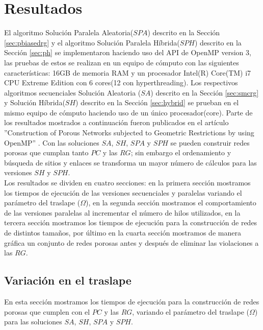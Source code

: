 \chapter{Resultados}
\label{champ:results}
\bigskip
\barra
\bigskip
El algoritmo Solución Paralela Aleatoria($SPA$) descrito en la Sección \ref{sec:pbiasedrg} y el algoritmo Solución Paralela Híbrida($SPH$) descrito en la Sección \ref{sec:ph} se implementaron haciendo uso del API de OpenMP version 3, las pruebas de estos se realizan en un equipo de cómputo con las siguientes características: 16GB de memoria  RAM y un procesador Intel(R) Core(TM) i7 CPU  Extreme Edition con 6 cores(12 con hyperthreading). Los respectivos  algoritmos secuenciales Solución Aleatoria ($SA$) descrito en la Sección \ref{sec:smcrg} y Solución Híbrida($SH$) descrito en la Sección \ref{sec:hybrid} se prueban en el mismo equipo de cómputo haciendo uso de un único procesador(core). Parte de los resultados mostrados a continuación fueron publicados en el artículo ''Construction of Porous Networks subjected to Geometric Restrictions by using OpenMP'' \cite{ref16}. Con las soluciones $SA$, $SH$, $SPA$ y $SPH$ se pueden construir redes porosas que cumplan tanto $PC$ y las $RG$; sin embargo el ordenamiento y búsqueda de sitios y enlaces se transforma un mayor número de cálculos para las versiones $SH$ y $SPH$.\\

Los resultados se dividen en cuatro secciones: en la primera sección mostramos los tiempos de ejecución de las versiones secuenciales y paralelas variando el parámetro del traslape ($\Omega$), en la segunda sección mostramos el comportamiento de las versiones paralelas al incrementar el número de hilos utilizados, en la tercera sección mostramos los tiempos de ejecución para la construcción de redes de distintos tamaños, por último en la cuarta sección mostramos de manera gráfica un conjunto de redes porosas antes y después de eliminar las violaciones a las $RG$.

\section*{Variación en el traslape}
En esta sección mostramos los tiempos de ejecución para la construcción de redes porosas que cumplen con el $PC$ y las $RG$, variando el parámetro del traslape ($\Omega$) para las soluciones $SA$, $SH$, $SPA$ y $SPH$.\\

